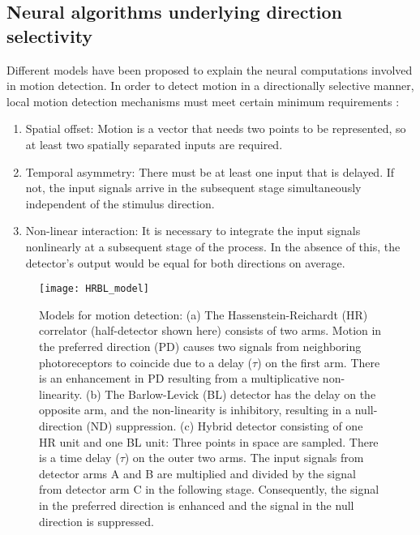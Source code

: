 \subsection{Neural algorithms underlying direction selectivity}
\label{sec:Neuralalgorithms}
Different models have been proposed to explain the neural computations involved in motion detection. In order to detect motion in a directionally selective manner, local motion detection mechanisms must meet certain minimum requirements \parencite{Borst1989}:
\begin{enumerate}
\item Spatial offset: Motion is a vector that needs two points to be represented, so at least two spatially separated inputs are required.
\item Temporal asymmetry: There must be at least one input that is delayed. If not, the input signals arrive in the subsequent stage simultaneously independent of the stimulus direction.
\item Non-linear interaction: It is necessary to integrate the input signals nonlinearly at a subsequent stage of the process. In the absence of this, the detector's output would be equal for both directions on average.
\end{enumerate} 

\begin{figure}
\centering
\hspace*{-1cm} 
\texttt{[image: HRBL\_model]}
\caption[Models for motion detection] {Models for motion detection: (a) The Hassenstein-Reichardt (HR) correlator (half-detector shown here) consists of two arms. Motion in the preferred direction (PD) causes two signals from neighboring photoreceptors to coincide due to a delay ($\tau$) on the first arm. There is an enhancement in PD resulting from a multiplicative non-linearity. (b) The Barlow-Levick (BL) detector has the delay on the opposite arm, and the non-linearity is inhibitory, resulting in a null-direction (ND) suppression. (c) Hybrid detector consisting of one HR unit and one BL unit: Three points in space are sampled. There is a time delay ($\tau$) on the outer two arms. The input signals from detector arms A and B are multiplied and divided by the signal from detector arm C in the following stage. Consequently, the signal in the preferred direction is enhanced and the signal in the null direction is suppressed.}
\label{fig:hrblmodel}
\end{figure}

